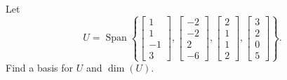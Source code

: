 \begin{example}
Let
\[
U = \operatorname{Span}\left\{
\begin{bmatrix} 1 \\ 1 \\ -1 \\ 3 \end{bmatrix},
\begin{bmatrix} -2 \\ -2 \\ 2 \\ -6 \end{bmatrix},
\begin{bmatrix} 2 \\ 1 \\ 1 \\ 2 \end{bmatrix},
\begin{bmatrix} 3 \\ 2 \\ 0 \\ 5 \end{bmatrix}
\right\}.
\]
Find a basis for $U$ and $\dim(U)$.


\end{example}
